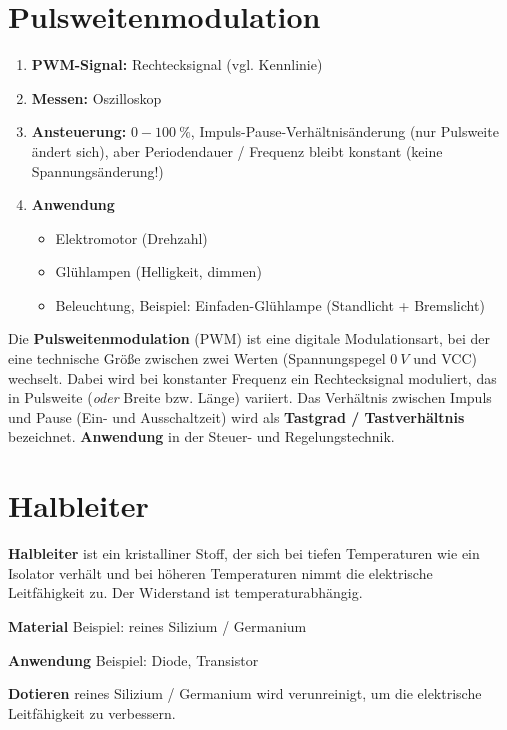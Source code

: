 \section{Pulsweitenmodulation}\label{pulsweitenmodulation}

\begin{enumerate}
\item
  \textbf{PWM-Signal:} Rechtecksignal (vgl. Kennlinie)
\item
  \textbf{Messen:} Oszilloskop
\item
  \textbf{Ansteuerung:} $0 - 100~\%$, Impuls-Pause-Verhältnisänderung
  (nur Pulsweite ändert sich), aber Periodendauer / Frequenz bleibt
  konstant (keine Spannungsänderung!)
\item
  \textbf{Anwendung}

  \begin{itemize}
  \item
    Elektromotor (Drehzahl)
  \item
    Glühlampen (Helligkeit, dimmen)
  \item
    Beleuchtung, Beispiel: Einfaden-Glühlampe (Standlicht + Bremslicht)
  \end{itemize}
\end{enumerate}

Die \textbf{Pulsweitenmodulation} (PWM) ist eine digitale
Modulationsart, bei der eine technische Größe zwischen zwei Werten
(Spannungspegel $0~V$ und VCC) wechselt. Dabei wird bei konstanter
Frequenz ein Rechtecksignal moduliert, das in Pulsweite (\emph{oder}
Breite bzw. Länge) variiert. Das Verhältnis zwischen Impuls und Pause
(Ein- und Ausschaltzeit) wird als \textbf{Tastgrad / Tastverhältnis}
bezeichnet. \textbf{Anwendung} in der Steuer- und Regelungstechnik.

\section{Halbleiter}\label{halbleiter}

\textbf{Halbleiter} ist ein kristalliner Stoff, der sich bei tiefen
Temperaturen wie ein Isolator verhält und bei höheren Temperaturen nimmt
die elektrische Leitfähigkeit zu. Der Widerstand ist temperaturabhängig.

\textbf{Material} Beispiel: reines Silizium / Germanium

\textbf{Anwendung} Beispiel: Diode, Transistor

\textbf{Dotieren} reines Silizium / Germanium wird verunreinigt, um die
elektrische Leitfähigkeit zu verbessern.

